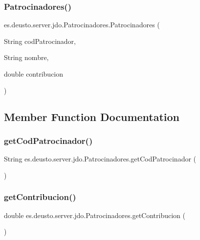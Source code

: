 \subsubsection{\texorpdfstring{Patrocinadores()}{Patrocinadores()}}
{\footnotesize\ttfamily es.\+deusto.\+server.\+jdo.\+Patrocinadores.\+Patrocinadores (\begin{DoxyParamCaption}\item[{String}]{cod\+Patrocinador,  }\item[{String}]{nombre,  }\item[{double}]{contribucion }\end{DoxyParamCaption})}



\subsection{Member Function Documentation}
\mbox{\label{classes_1_1deusto_1_1server_1_1jdo_1_1_patrocinadores_a8eb8dbed078066e785bbcae2dc4a2097}} 
\subsubsection{\texorpdfstring{getCodPatrocinador()}{getCodPatrocinador()}}
{\footnotesize\ttfamily String es.\+deusto.\+server.\+jdo.\+Patrocinadores.\+get\+Cod\+Patrocinador (\begin{DoxyParamCaption}{ }\end{DoxyParamCaption})}

\mbox{\label{classes_1_1deusto_1_1server_1_1jdo_1_1_patrocinadores_a7f7c99720f20dcbfbec1b31babe7c59f}} 
\subsubsection{\texorpdfstring{getContribucion()}{getContribucion()}}
{\footnotesize\ttfamily double es.\+deusto.\+server.\+jdo.\+Patrocinadores.\+get\+Contribucion (\begin{DoxyParamCaption}{ }\end{DoxyParamCaption})}

